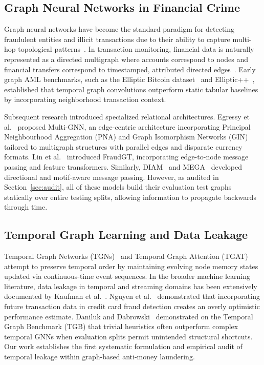 \documentclass[10pt,twocolumn,letterpaper]{article}
\begin{document}
\subsection{Graph Neural Networks in Financial Crime}
Graph neural networks have become the standard paradigm for detecting fraudulent entities and illicit transactions due to their ability to capture multi-hop topological patterns~\cite{kipf2017gcn,hamilton2017sage,velickovic2018gat,xu2018jk}. In transaction monitoring, financial data is naturally represented as a directed multigraph where accounts correspond to nodes and financial transfers correspond to timestamped, attributed directed edges~\cite{altman2023ibmaml,egressy2024multigraph}. Early graph AML benchmarks, such as the Elliptic Bitcoin dataset~\cite{weber2019elliptic} and Elliptic++~\cite{elmougy2023ellipticpp}, established that temporal graph convolutions outperform static tabular baselines by incorporating neighborhood transaction context.

Subsequent research introduced specialized relational architectures. Egressy et al.~\cite{egressy2024multigraph} proposed Multi-GNN, an edge-centric architecture incorporating Principal Neighbourhood Aggregation (PNA) and Graph Isomorphism Networks (GIN) tailored to multigraph structures with parallel edges and disparate currency formats. Lin et al.~\cite{lin2024fraudgt} introduced FraudGT, incorporating edge-to-node message passing and feature transformers. Similarly, DIAM~\cite{ding2024diam} and MEGA~\cite{bilgi2026mega} developed directional and motif-aware message passing. However, as audited in Section~\ref{sec:audit}, all of these models build their evaluation test graphs statically over entire testing splits, allowing information to propagate backwards through time.

\subsection{Temporal Graph Learning and Data Leakage}
Temporal Graph Networks (TGNs)~\cite{rossi2020tgn} and Temporal Graph Attention (TGAT)~\cite{xu2020tgat} attempt to preserve temporal order by maintaining evolving node memory states updated via continuous-time event sequences. In the broader machine learning literature, data leakage in temporal and streaming domains has been extensively documented by Kaufman et al.~\cite{kaufman2012leakage}. Nguyen et al.~\cite{nguyen2022future} demonstrated that incorporating future transaction data in credit card fraud detection creates an overly optimistic performance estimate. Daniluk and Dabrowski~\cite{daniluk2023global} demonstrated on the Temporal Graph Benchmark (TGB) that trivial heuristics often outperform complex temporal GNNs when evaluation splits permit unintended structural shortcuts. Our work establishes the first systematic formulation and empirical audit of temporal leakage within graph-based anti-money laundering.
\end{document}
